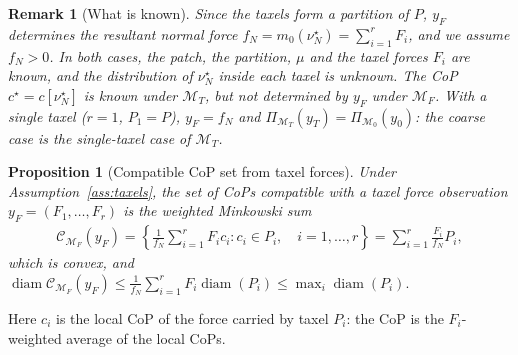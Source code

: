 \documentclass[11pt,a4paper]{article}
\theoremstyle{plain}
\newtheorem{proposition}[theorem]{Proposition}
\newtheorem{remark}[theorem]{Remark}
\begin{document}
\begin{remark}[What is known]
     Since the taxels form a partition of $P$, $y_F$ determines the resultant normal force $f_N=m_0(\nu_N^\star) = \sum_{i=1}^r F_i$, and we assume $f_N>0$.
     In both cases, the patch, the partition, $\mu$ and the taxel forces $F_i$ are known, and the distribution of $\nu_N^\star$ inside each taxel is unknown.
     The CoP $c^\star=c[\nu_N^\star]$ is known under $\mathcal M_T$, but not determined by $y_F$ under $\mathcal M_F$. With a single taxel ($r=1$, $P_1=P$),
     $y_F=f_N$ and $\Pi_{\mathcal M_T}(y_T)=\Pi_{\mathcal M_0}(y_0)$: the coarse case is the single-taxel case of $\mathcal M_T$.
\end{remark}

\begin{proposition}[Compatible CoP set from taxel forces]
\label{prop:cop_taxel}
    Under Assumption~\ref{ass:taxels}, the set of CoPs compatible with a taxel force observation $y_F = (F_1,\ldots,F_r)$ is the weighted Minkowski sum
    \begin{align}
        \mathcal C_{\mathcal M_F}(y_F)
        =
        \left\{
        \frac{1}{f_N}
        \sum_{i=1}^r F_i c_i
        :
        c_i\in P_i,\quad i=1,\ldots,r
        \right\}
        =\sum_{i=1}^r\frac{F_i}{f_N}P_i,
    \end{align}
    which is convex, and $\operatorname{diam} \mathcal C_{\mathcal M_F}(y_F)\le\frac{1}{f_N}\sum_{i=1}^r F_i\operatorname{diam}(P_i)\le\max_i\operatorname{diam}(P_i).$
\end{proposition}
Here $c_i$ is the local CoP of the force carried by taxel $P_i$: the CoP is the $F_i$-weighted average of the local CoPs.
\end{document}
